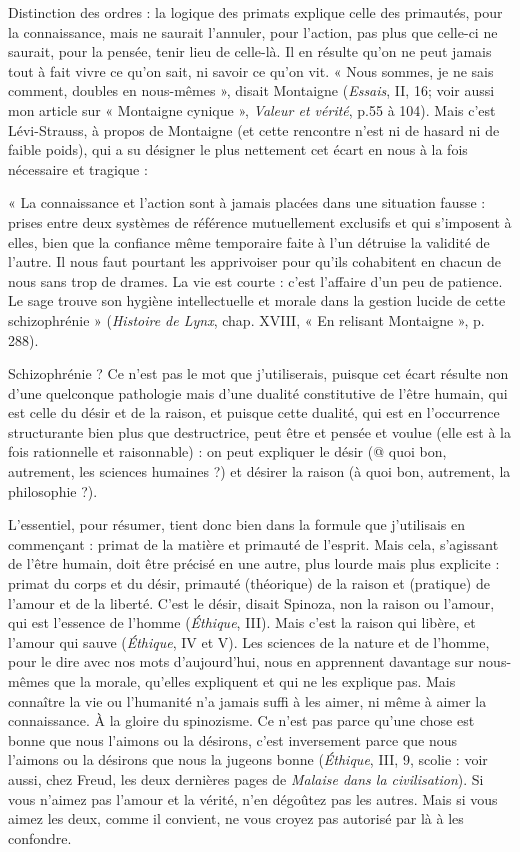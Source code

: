 Distinction des ordres : la logique des primats explique celle des primautés,
pour la connaissance, mais ne saurait l’annuler, pour l’action, pas plus que
celle-ci ne saurait, pour la pensée, tenir lieu de celle-là. Il en résulte qu’on ne
peut jamais tout à fait vivre ce qu’on sait, ni savoir ce qu'on vit. « Nous
sommes, je ne sais comment, doubles en nous-mêmes », disait Montaigne
({\it Essais}, II, 16; voir aussi mon article sur « Montaigne cynique », {\it Valeur et
vérité}, p.55 à 104). Mais c’est Lévi-Strauss, à propos de Montaigne (et cette
rencontre n’est ni de hasard ni de faible poids), qui a su désigner le plus nettement
cet écart en nous à la fois nécessaire et tragique :

{\footnotesize « La connaissance et l’action sont à jamais placées dans une situation fausse : prises
entre deux systèmes de référence mutuellement exclusifs et qui s'imposent à elles, bien
que la confiance même temporaire faite à l’un détruise la validité de l’autre. Il nous faut
pourtant les apprivoiser pour qu’ils cohabitent en chacun de nous sans trop de drames.
La vie est courte : c’est l'affaire d’un peu de patience. Le sage trouve son hygiène intellectuelle
et morale dans la gestion lucide de cette schizophrénie » ({\it Histoire de Lynx},
chap. XVIII, « En relisant Montaigne », p. 288).
}

Schizophrénie ? Ce n’est pas le mot que j’utiliserais, puisque cet écart
résulte non d’une quelconque pathologie mais d’une dualité constitutive de
l'être humain, qui est celle du désir et de la raison, et puisque cette dualité, qui
est en l'occurrence structurante bien plus que destructrice, peut être et pensée
et voulue (elle est à la fois rationnelle et raisonnable) : on peut expliquer le désir
(@ quoi bon, autrement, les sciences humaines ?) et désirer la raison (à quoi
bon, autrement, la philosophie ?).

L'essentiel, pour résumer, tient donc bien dans la formule que j’utilisais en
commençant : primat de la matière et primauté de l'esprit. Mais cela, s’agissant
de l'être humain, doit être précisé en une autre, plus lourde mais plus explicite :
primat du corps et du désir, primauté (théorique) de la raison et (pratique) de
l’amour et de la liberté. C’est le désir, disait Spinoza, non la raison ou l’amour,
qui est l'essence de l’homme ({\it Éthique}, III). Mais c’est la raison qui libère, et
l'amour qui sauve ({\it Éthique}, IV et V). Les sciences de la nature et de l’homme,
pour le dire avec nos mots d’aujourd’hui, nous en apprennent davantage sur
nous-mêmes que la morale, qu’elles expliquent et qui ne les explique pas. Mais
connaître la vie ou l’humanité n’a jamais suffi à les aimer, ni même à aimer la
connaissance. À la gloire du spinozisme. Ce n’est pas parce qu’une chose est
bonne que nous l’aimons ou la désirons, c’est inversement parce que nous
l’aimons ou la désirons que nous la jugeons bonne ({\it Éthique}, III, 9, scolie : voir
aussi, chez Freud, les deux dernières pages de {\it Malaise dans la civilisation}). Si
vous n’aimez pas l’amour et la vérité, n’en dégoûtez pas les autres. Mais si vous
aimez les deux, comme il convient, ne vous croyez pas autorisé par là à les
confondre.

